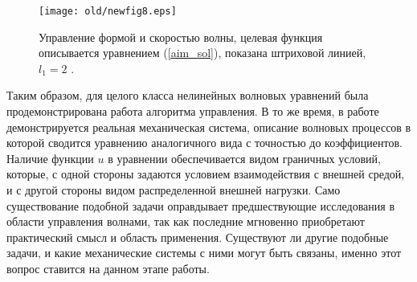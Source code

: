 %
%
\begin{figure}[!ht]
	\begin{center}
		\texttt{[image: old/newfig8.eps]}
	\end{center}
	\caption{\label{f:ris8}Управление формой и скоростью волны, целевая функция описывается уравнением (\ref{aim_sol}), показана штриховой линией, $l_1 = 2$ \cite{porant16}.}
\end{figure}

Таким образом, для целого класса нелинейных волновых уравнений была продемонстрирована работа алгоритма управления. В то же время, в работе \cite{PorubovAntonov2018mechSystem} демонстрируется реальная механическая система, описание волновых процессов в которой сводится уравнению аналогичного вида с точностью до коэффициентов. Наличие функции $u$ в уравнении обеспечивается видом граничных условий, которые, с одной стороны задаются условием взаимодействия с внешней средой, и с другой стороны видом распределенной внешней нагрузки. Само существование подобной задачи оправдывает предшествующие исследования в области управления волнами, так как последние мгновенно приобретают практический смысл и область применения. Существуют ли другие подобные задачи, и какие механические системы с ними могут быть связаны, именно этот вопрос ставится на данном этапе работы.
%



